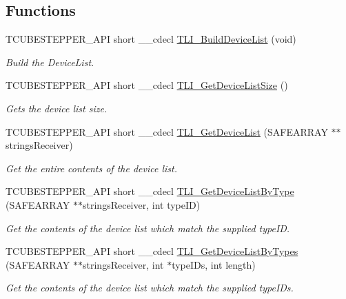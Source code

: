 \subsection*{Functions}
\begin{DoxyCompactItemize}
\item 
T\+C\+U\+B\+E\+S\+T\+E\+P\+P\+E\+R\+\_\+\+A\+PI short \+\_\+\+\_\+cdecl \hyperlink{group___t_cube_stepper_ga5acb32b8dcdab91d5a332d6e944ee2c3}{T\+L\+I\+\_\+\+Build\+Device\+List} (void)
\begin{DoxyCompactList}\small\item\em Build the Device\+List. \end{DoxyCompactList}\item 
T\+C\+U\+B\+E\+S\+T\+E\+P\+P\+E\+R\+\_\+\+A\+PI short \+\_\+\+\_\+cdecl \hyperlink{group___t_cube_stepper_ga1bf2fb46f11c1f724c3066c4c49f09d0}{T\+L\+I\+\_\+\+Get\+Device\+List\+Size} ()
\begin{DoxyCompactList}\small\item\em Gets the device list size. \end{DoxyCompactList}\item 
T\+C\+U\+B\+E\+S\+T\+E\+P\+P\+E\+R\+\_\+\+A\+PI short \+\_\+\+\_\+cdecl \hyperlink{group___t_cube_stepper_ga40ce939340d6c97da9e2ec83e69110b7}{T\+L\+I\+\_\+\+Get\+Device\+List} (S\+A\+F\+E\+A\+R\+R\+AY $\ast$$\ast$strings\+Receiver)
\begin{DoxyCompactList}\small\item\em Get the entire contents of the device list. \end{DoxyCompactList}\item 
T\+C\+U\+B\+E\+S\+T\+E\+P\+P\+E\+R\+\_\+\+A\+PI short \+\_\+\+\_\+cdecl \hyperlink{group___t_cube_stepper_ga9f4090cdbe81d4c85cab14b8e349ea51}{T\+L\+I\+\_\+\+Get\+Device\+List\+By\+Type} (S\+A\+F\+E\+A\+R\+R\+AY $\ast$$\ast$strings\+Receiver, int type\+ID)
\begin{DoxyCompactList}\small\item\em Get the contents of the device list which match the supplied type\+ID. \end{DoxyCompactList}\item 
T\+C\+U\+B\+E\+S\+T\+E\+P\+P\+E\+R\+\_\+\+A\+PI short \+\_\+\+\_\+cdecl \hyperlink{group___t_cube_stepper_ga01096dc1fa10e837ae8f67812bb8d6f8}{T\+L\+I\+\_\+\+Get\+Device\+List\+By\+Types} (S\+A\+F\+E\+A\+R\+R\+AY $\ast$$\ast$strings\+Receiver, int $\ast$type\+I\+Ds, int length)
\begin{DoxyCompactList}\small\item\em Get the contents of the device list which match the supplied type\+I\+Ds. \end{DoxyCompactList}\item 
$$
\end{DoxyCompactItemize}
